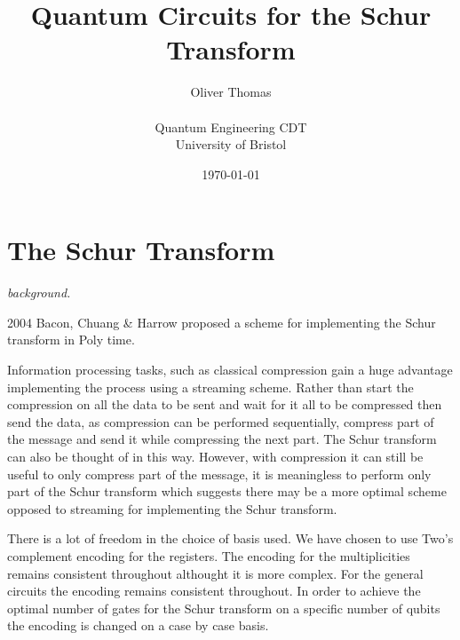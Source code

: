 \documentclass[12pt]{article}
\begin{document}

    \title{Quantum Circuits for the Schur Transform}
    \author{Oliver Thomas \\[0.5em] \\ Quantum Engineering CDT \\ University of Bristol}
    \date{\today}
    \maketitle

%

%
%
%
%

%

%

\section{The Schur Transform}

\textit{background.}

2004 Bacon, Chuang \& Harrow proposed a scheme for implementing the Schur transform in Poly time. 


Information processing tasks, such as classical compression gain a huge advantage implementing the process
using a streaming scheme. Rather than start the compression on all the data to be sent and wait for it all to
be compressed then send the data, as compression can be performed sequentially, compress part of the message
and send it while compressing the next part. The Schur transform can also be thought of in this way. However,
with compression it can still be useful to only compress part of the message, it is meaningless to perform only
part of the Schur transform which suggests there may be a more optimal scheme opposed to streaming for 
implementing the Schur transform.      

There is a lot of freedom in the choice of basis used. We have chosen to use Two's complement encoding for the registers. The encoding for the multiplicities remains consistent throughout althought it is more complex. For the general circuits the encoding remains consistent throughout. In order to achieve the optimal number of gates for the Schur transform on a specific number of qubits the encoding is changed on a case by case basis. 
\end{document}
